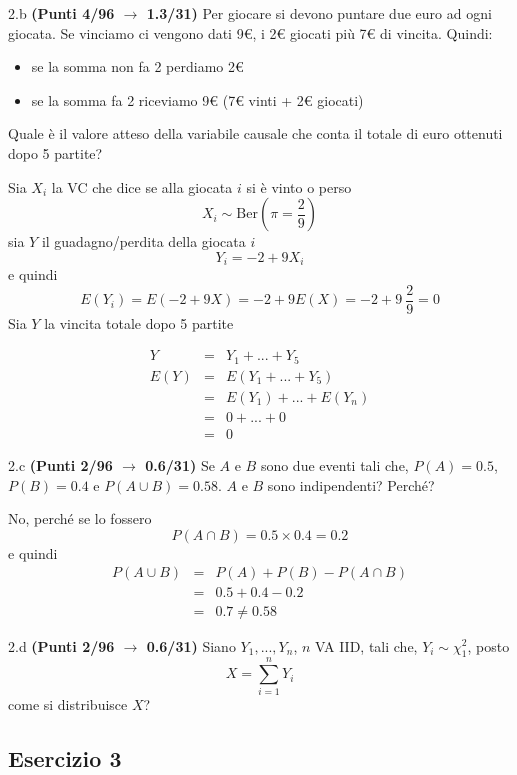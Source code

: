 \documentclass[
  11pt,
]{book}
\providecommand{\tightlist}{%
  \setlength{\itemsep}{0pt}\setlength{\parskip}{0pt}}
\theoremstyle{mytheoremstyle}
\theoremstyle{mydefstyle}
\newenvironment{sol}
  {
  \begin{tcolorbox}[enhanced,breakable,arc=0.1mm,boxrule=1pt,colback=white,colframe=iblue,
  title=\bf \fontfamily{lmss}\selectfont \hspace{.5 cm} Soluzione,drop fuzzy shadow]

}{
\end{tcolorbox}
  }
\begin{document}
2.b \textbf{(Punti 4/96 \(\rightarrow\) 1.3/31)} Per giocare si devono puntare due euro ad ogni giocata. Se vinciamo ci vengono dati 9€, i 2€ giocati più 7€ di vincita. Quindi:

\begin{itemize}
\tightlist
\item
  se la somma non fa 2 perdiamo 2€
\item
  se la somma fa 2 riceviamo 9€ (7€ vinti + 2€ giocati)
\end{itemize}

Quale è il valore atteso della variabile causale che conta il totale di euro ottenuti dopo 5 partite?

\begin{sol}
Sia \(X_i\) la VC che dice se alla giocata \(i\) si è vinto o perso
\[
X_i\sim\text{Ber}\left(\pi=\frac 29\right)
\]
sia \(Y\) il guadagno/perdita della giocata \(i\)
\[
Y_i=-2+9X_i
\]
e quindi
\[
E(Y_i)=E(-2+9X)=-2+9E(X)=-2+9~\frac29=0
\]
Sia \(Y\) la vincita totale dopo 5 partite

\begin{eqnarray*}
  Y  &=&Y_1+...+Y_5\\
E(Y) &=&E(Y_1+...+Y_5)\\
     &=&E(Y_1)+...+E(Y_n)\\
     &=& 0+...+0\\
     &=& 0
\end{eqnarray*}

\end{sol}

2.c \textbf{(Punti 2/96 \(\rightarrow\) 0.6/31)} Se \(A\) e \(B\) sono due eventi tali che, \(P(A)=0.5\), \(P(B)=0.4\) e \(P(A\cup B)=0.58\). \(A\) e \(B\) sono indipendenti? Perché?

\begin{sol}
No, perché se lo fossero
\[
P(A\cap B)=0.5\times 0.4=0.2
\]
e quindi
\begin{eqnarray*}
  P(A\cup B) &=& P(A)+P(B)-P(A\cap B)\\
             &=& 0.5+0.4-0.2\\
             &=& 0.7\ne 0.58
\end{eqnarray*}

\end{sol}

2.d \textbf{(Punti 2/96 \(\rightarrow\) 0.6/31)} Siano \(Y_1,...,Y_n\), \(n\) VA IID, tali che, \(Y_i\sim\chi_{1}^2\), posto
\[
X=\sum_{i=1}^n Y_i
\]
come si distribuisce \(X\)?

\subsection{Esercizio 3}\label{esercizio-3-7}
\end{document}
